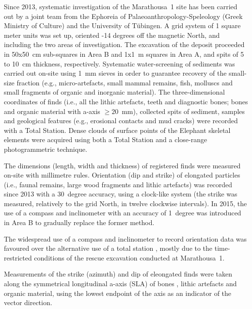\documentclass[preprint,authoryear,times]{elsarticle} %
\begin{document}
Since 2013, systematic investigation of the Marathousa~1 site has been carried out by a joint team from the Ephoreia of Palaeoanthropology-Speleology (Greek Ministry of Culture) and the University of Tübingen. A grid system of 1 square meter units was set up, oriented -14 degrees off the magnetic North, and including the two areas of investigation. The excavation of the deposit proceeded in 50x50~cm sub-squares in Area B and 1x1~m squares in Area A, and spits of 5 to 10~cm thickness, respectively. Systematic water-screening of sediments was carried out on-site using 1~mm sieves in order to guarantee recovery of the small-size fraction (e.g., micro-artefacts, small mammal remains, fish, molluscs and small fragments of organic and inorganic material). The three-dimensional coordinates of finds (i.e., all the lithic artefacts, teeth and diagnostic bones; bones and organic material with a-axis $\geq20$~mm), collected spits of sediment, samples and geological features (e.g., erosional contacts and mud cracks) were recorded with a Total Station. Dense clouds of surface points of the Elephant skeletal elements were acquired using both a Total Station and a close-range photogrammetric technique. %

The dimensions (length, width and thickness) of registered finds were measured on-site with millimetre rules. Orientation (dip and strike) of elongated particles (i.e., faunal remains, large wood fragments and lithic artefacts) was recorded since 2013 with a 30~degree accuracy, using a clock-like system (the strike was measured, relatively to the grid North, in twelve clockwise intervals). In 2015, the use of a compass and inclinometer with an accuracy of 1~degree was introduced in Area B to gradually replace the former method.

The widespread use of a compass and inclinometer to record orientation data \citep[][among others]{Voorhies1966,Bertran1995,Bertran1997,Lenoble2004,Eberth2007,Eren2010,Benito-Calvo2011a,Dominguez-Rodrigo2012,Dominguez-Rodrigo2013,Dominguez-Rodrigo2014,Cobo-Sanchez2014,Organista2017} was favoured over the alternative use of a total station \citep[][among others]{Kluskens1990,Dibble1997,McPherron2005,Enloe2006,Bernatchez2010}, mostly due to the time-restricted conditions of the rescue excavation conducted at Marathousa~1.

Measurements of the strike (azimuth) and dip of eleongated finds were taken along the symmetrical longitudinal a-axis (SLA) of bones \citep{Dominguez-Rodrigo2013}, lithic artefacts \citep{Bertran1995} and organic material, using the lowest endpoint of the axis as an indicator of the vector direction.
\end{document}
